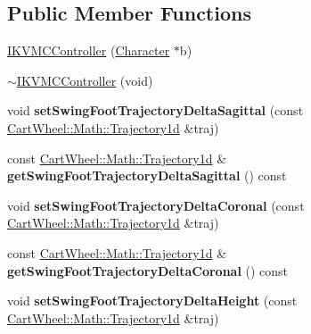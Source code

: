 \subsection*{Public Member Functions}
\begin{DoxyCompactItemize}
\item 
\hyperlink{classCartWheel_1_1Core_1_1IKVMCController_a1eb43256c937b02a1f903fc4a268206f}{IKVMCController} (\hyperlink{classCartWheel_1_1Core_1_1Character}{Character} $\ast$b)
\item 
\hyperlink{classCartWheel_1_1Core_1_1IKVMCController_a11bca200b630959187dd7182c9acbff9}{$\sim$IKVMCController} (void)
\item 
\hypertarget{classCartWheel_1_1Core_1_1IKVMCController_a7b627049429a271fde384a964ebbaf5c}{
void {\bfseries setSwingFootTrajectoryDeltaSagittal} (const \hyperlink{classCartWheel_1_1Math_1_1GenericTrajectory}{CartWheel::Math::Trajectory1d} \&traj)}
\label{classCartWheel_1_1Core_1_1IKVMCController_a7b627049429a271fde384a964ebbaf5c}

\item 
\hypertarget{classCartWheel_1_1Core_1_1IKVMCController_a7dd9a834fa7cf0ee0580ca32829d6b82}{
const \hyperlink{classCartWheel_1_1Math_1_1GenericTrajectory}{CartWheel::Math::Trajectory1d} \& {\bfseries getSwingFootTrajectoryDeltaSagittal} () const }
\label{classCartWheel_1_1Core_1_1IKVMCController_a7dd9a834fa7cf0ee0580ca32829d6b82}

\item 
\hypertarget{classCartWheel_1_1Core_1_1IKVMCController_ac529703572c7dae89535eb930ea780f1}{
void {\bfseries setSwingFootTrajectoryDeltaCoronal} (const \hyperlink{classCartWheel_1_1Math_1_1GenericTrajectory}{CartWheel::Math::Trajectory1d} \&traj)}
\label{classCartWheel_1_1Core_1_1IKVMCController_ac529703572c7dae89535eb930ea780f1}

\item 
\hypertarget{classCartWheel_1_1Core_1_1IKVMCController_a810a6fb0dafd9c5a12aa44645288de1a}{
const \hyperlink{classCartWheel_1_1Math_1_1GenericTrajectory}{CartWheel::Math::Trajectory1d} \& {\bfseries getSwingFootTrajectoryDeltaCoronal} () const }
\label{classCartWheel_1_1Core_1_1IKVMCController_a810a6fb0dafd9c5a12aa44645288de1a}

\item 
\hypertarget{classCartWheel_1_1Core_1_1IKVMCController_a84cd0071112e56eadabfb40901d2b384}{
void {\bfseries setSwingFootTrajectoryDeltaHeight} (const \hyperlink{classCartWheel_1_1Math_1_1GenericTrajectory}{CartWheel::Math::Trajectory1d} \&traj)}
\label{classCartWheel_1_1Core_1_1IKVMCController_a84cd0071112e56eadabfb40901d2b384}


\end{DoxyCompactItemize}
